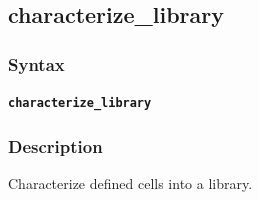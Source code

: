 \pagebreak
\subsection*{characterize_library}
\subsubsection*{Syntax}
\texttt{\textbf{characterize_library}}\newline
\subsubsection*{Description}
Characterize defined cells into a library.